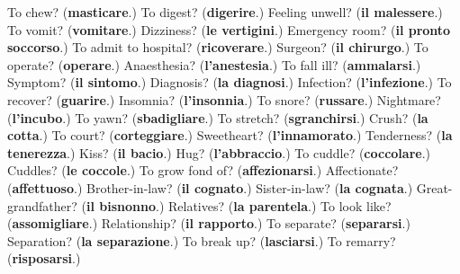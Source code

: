 \begin{tcolorbox}[breakable,colback=teal!4,colframe=teal!35!black,title={Before you move on}]
To chew? (\textbf{masticare}.) To digest? (\textbf{digerire}.) Feeling unwell? (\textbf{il malessere}.) To vomit? (\textbf{vomitare}.) Dizziness? (\textbf{le vertigini}.) Emergency room? (\textbf{il pronto soccorso}.) To admit to hospital? (\textbf{ricoverare}.) Surgeon? (\textbf{il chirurgo}.) To operate? (\textbf{operare}.) Anaesthesia? (\textbf{l'anestesia}.) To fall ill? (\textbf{ammalarsi}.) Symptom? (\textbf{il sintomo}.) Diagnosis? (\textbf{la diagnosi}.) Infection? (\textbf{l'infezione}.) To recover? (\textbf{guarire}.) Insomnia? (\textbf{l'insonnia}.) To snore? (\textbf{russare}.) Nightmare? (\textbf{l'incubo}.) To yawn? (\textbf{sbadigliare}.) To stretch? (\textbf{sgranchirsi}.) Crush? (\textbf{la cotta}.) To court? (\textbf{corteggiare}.) Sweetheart? (\textbf{l'innamorato}.) Tenderness? (\textbf{la tenerezza}.) Kiss? (\textbf{il bacio}.) Hug? (\textbf{l'abbraccio}.) To cuddle? (\textbf{coccolare}.) Cuddles? (\textbf{le coccole}.) To grow fond of? (\textbf{affezionarsi}.) Affectionate? (\textbf{affettuoso}.) Brother-in-law? (\textbf{il cognato}.) Sister-in-law? (\textbf{la cognata}.) Great-grandfather? (\textbf{il bisnonno}.) Relatives? (\textbf{la parentela}.) To look like? (\textbf{assomigliare}.) Relationship? (\textbf{il rapporto}.) To separate? (\textbf{separarsi}.) Separation? (\textbf{la separazione}.) To break up? (\textbf{lasciarsi}.) To remarry? (\textbf{risposarsi}.)
\end{tcolorbox}
